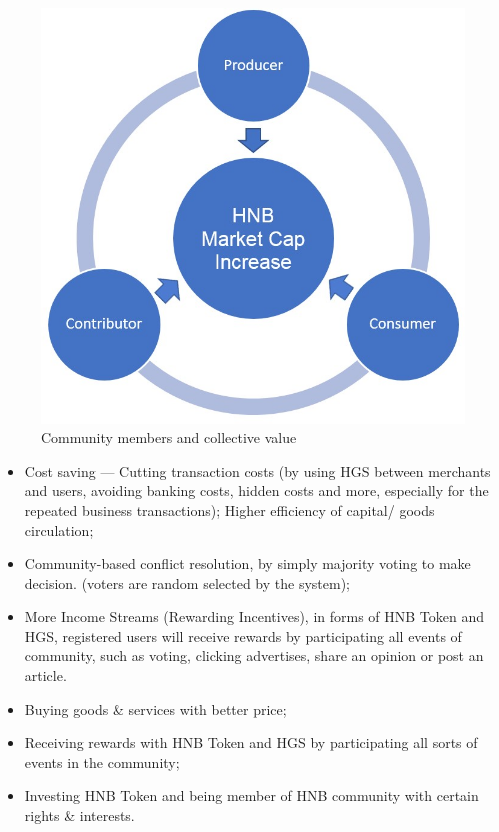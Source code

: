 \documentclass[fleqn,10pt]{SelfArx} %
\begin{document}
\begin{figure}[ht]\centering
\includegraphics[width=\linewidth]{7}
\caption{Community members and collective value}
\label{fig:7}
\end{figure}

\begin{itemize}
\item{Cost saving --- Cutting transaction costs (by using HGS between merchants and users, avoiding banking costs, hidden costs and more, especially for the repeated business transactions); Higher efficiency of capital/ goods circulation;}
\item{Community-based conflict resolution, by simply majority voting to make decision. (voters are random selected by the system);}
\item{More Income Streams (Rewarding Incentives), in forms of HNB Token and HGS, registered users will receive rewards by participating all events of community, such as voting, clicking advertises, share an opinion or post an article.}
\end{itemize}

\begin{itemize}
\item{Buying goods \& services with better price; }
\item{Receiving rewards with HNB Token and HGS by participating all sorts of events in the community;}
\item{Investing HNB Token and being member of HNB community with certain rights \& interests.}
\end{itemize}
\end{document}
